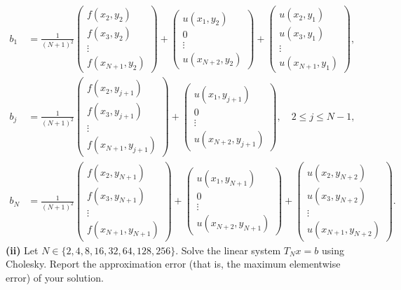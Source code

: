 \documentclass[paper=a4, fontsize=11pt]{scrartcl} %
\numberwithin{equation}{section} %
\numberwithin{figure}{section} %
\numberwithin{table}{section} %
\begin{document}
\begin{align}
\nonumber b_1 &= \frac{1}{(N+1)^2}\begin{pmatrix}
f(x_2,y_2)\\
f(x_3,y_2)\\
\vdots\\
f(x_{N+1},y_2)
\end{pmatrix}
+\begin{pmatrix}
u(x_1,y_2)\\
0\\
\vdots\\
u(x_{N+2},y_2)
\end{pmatrix}
+\begin{pmatrix}
u(x_2,y_1)\\
u(x_3,y_1)\\
\vdots\\
u(x_{N+1},y_1)
\end{pmatrix},\\
\nonumber b_j &= \frac{1}{(N+1)^2}\begin{pmatrix}
f(x_2,y_{j+1})\\
f(x_3,y_{j+1})\\
\vdots\\
f(x_{N+1},y_{j+1})
\end{pmatrix}
+\begin{pmatrix}
u(x_1,y_{j+1})\\
0\\
\vdots\\
u(x_{N+2},y_{j+1})
\end{pmatrix}, \quad 2\le j\le N-1,\\
\nonumber b_N &= \frac{1}{(N+1)^2}\begin{pmatrix}
f(x_2,y_{N+1})\\
f(x_3,y_{N+1})\\
\vdots\\
f(x_{N+1},y_{N+1})
\end{pmatrix}
+\begin{pmatrix}
u(x_1,y_{N+1})\\
0\\
\vdots\\
u(x_{N+2},y_{N+1})
\end{pmatrix}
+\begin{pmatrix}
u(x_2,y_{N+2})\\
u(x_3,y_{N+2})\\
\vdots\\
u(x_{N+1},y_{N+2})
\end{pmatrix}.
\end{align}
\textbf{(ii)} Let $N \in \{2, 4, 8, 16, 32, 64, 128, 256\}$. Solve the linear system $T_N x =b$ using
Cholesky. Report the approximation error (that is, the maximum elementwise error) of your
solution.
\end{document}
